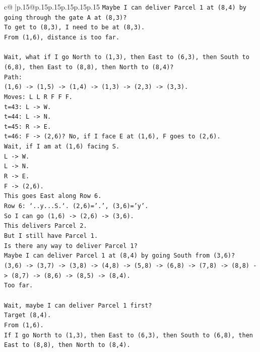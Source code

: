 \documentclass{article}
\begin{document}
{\begin{supertabular}{c@{$\;$}|p{.15\linewidth}@{}p{.15\linewidth}p{.15\linewidth}p{.15\linewidth}p{.15\linewidth}p{.15\linewidth}}
{{{\texttt{Maybe I can deliver Parcel 1 at (8,4) by going through the gate A at (8,3)?} \\
\texttt{To get to (8,3), I need to be at (8,3).} \\
\texttt{From (1,6), distance is too far.} \\
\\ 
\texttt{Wait, what if I go North to (1,3), then East to (6,3), then South to (6,8), then East to (8,8), then North to (8,4)?} \\
\texttt{Path:} \\
\texttt{(1,6) {-}> (1,5) {-}> (1,4) {-}> (1,3) {-}> (2,3) {-}> (3,3).} \\
\texttt{Moves: L L R F F F.} \\
\texttt{t=43: L {-}> W.} \\
\texttt{t=44: L {-}> N.} \\
\texttt{t=45: R {-}> E.} \\
\texttt{t=46: F {-}> (2,6)? No, if I face E at (1,6), F goes to (2,6).} \\
\texttt{Wait, if I am at (1,6) facing S.} \\
\texttt{L {-}> W.} \\
\texttt{L {-}> N.} \\
\texttt{R {-}> E.} \\
\texttt{F {-}> (2,6).} \\
\texttt{This goes East along Row 6.} \\
\texttt{Row 6: `..y...S.`. (2,6)='.', (3,6)='y'.} \\
\texttt{So I can go (1,6) {-}> (2,6) {-}> (3,6).} \\
\texttt{This delivers Parcel 2.} \\
\texttt{But I still have Parcel 1.} \\
\texttt{Is there any way to deliver Parcel 1?} \\
\texttt{Maybe I can deliver Parcel 1 at (8,4) by going South from (3,6)?} \\
\texttt{(3,6) {-}> (3,7) {-}> (3,8) {-}> (4,8) {-}> (5,8) {-}> (6,8) {-}> (7,8) {-}> (8,8) {-}> (8,7) {-}> (8,6) {-}> (8,5) {-}> (8,4).} \\
\texttt{Too far.} \\
\\ 
\texttt{Wait, maybe I can deliver Parcel 1 first?} \\
\texttt{Target (8,4).} \\
\texttt{From (1,6).} \\
\texttt{If I go North to (1,3), then East to (6,3), then South to (6,8), then East to (8,8), then North to (8,4).} \\
}}}
\end{supertabular}}
\end{document}
